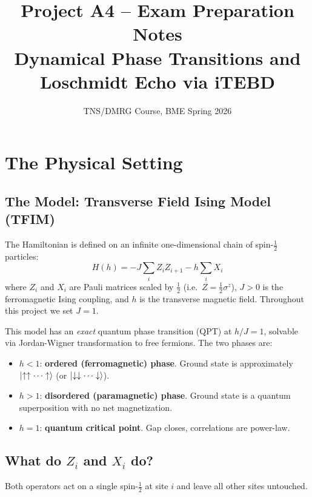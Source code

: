 \documentclass[11pt, a4paper]{article}
\title{\textbf{Project A4 -- Exam Preparation Notes}\\
\large Dynamical Phase Transitions and Loschmidt Echo via iTEBD}
\author{TNS/DMRG Course, BME Spring 2026}
\date{}
\begin{document}
\maketitle
\tableofcontents
\newpage

\section{The Physical Setting}

\subsection{The Model: Transverse Field Ising Model (TFIM)}

The Hamiltonian is defined on an infinite one-dimensional chain of spin-$\tfrac{1}{2}$ particles:
\begin{equation}
  H(h) = -J \sum_{i} Z_i Z_{i+1} - h \sum_{i} X_i
  \label{eq:tfim}
\end{equation}
where $Z_i$ and $X_i$ are Pauli matrices scaled by $\tfrac{1}{2}$ (i.e.\ $Z = \frac{1}{2}\sigma^z$), $J > 0$ is the ferromagnetic Ising coupling, and $h$ is the transverse magnetic field. Throughout this project we set $J = 1$.

This model has an \emph{exact} quantum phase transition (QPT) at $h/J = 1$, solvable via Jordan-Wigner transformation to free fermions. The two phases are:
\begin{itemize}
  \item $h < 1$: \textbf{ordered (ferromagnetic) phase}. Ground state is approximately $\ket{\uparrow\uparrow\cdots\uparrow}$ (or $\ket{\downarrow\downarrow\cdots\downarrow}$).
  \item $h > 1$: \textbf{disordered (paramagnetic) phase}. Ground state is a quantum superposition with no net magnetization.
  \item $h = 1$: \textbf{quantum critical point}. Gap closes, correlations are power-law.
\end{itemize}

\subsection{What do $Z_i$ and $X_i$ do?}

Both operators act on a single spin-$\tfrac{1}{2}$ at site $i$ and leave all other sites untouched.
\end{document}

